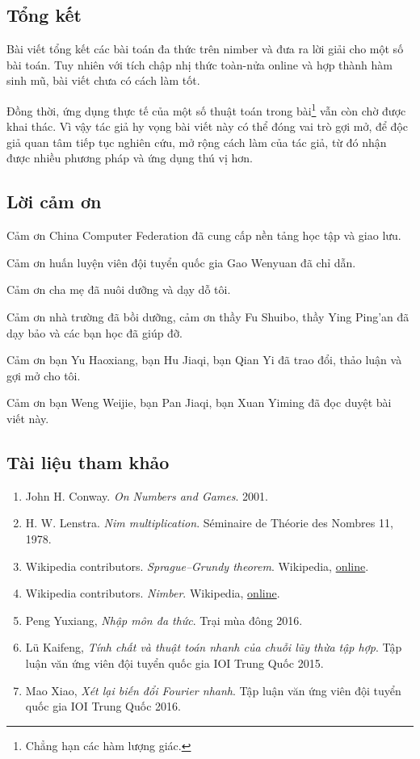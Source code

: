\documentclass[11pt]{article}
\begin{document}
\subsection{Tổng kết}

Bài viết tổng kết các bài toán đa thức trên nimber và đưa ra lời giải cho một
số bài toán. Tuy nhiên với tích chập nhị thức toàn-nửa online và hợp thành hàm
sinh mũ, bài viết chưa có cách làm tốt.

Đồng thời, ứng dụng thực tế của một số thuật toán trong bài\footnote{Chẳng hạn
các hàm lượng giác.} vẫn còn chờ được khai thác. Vì vậy tác giả hy vọng bài
viết này có thể đóng vai trò gợi mở, để độc giả quan tâm tiếp tục nghiên cứu,
mở rộng cách làm của tác giả, từ đó nhận được nhiều phương pháp và ứng dụng thú
vị hơn.

\subsection*{Lời cảm ơn}

Cảm ơn China Computer Federation đã cung cấp nền tảng học tập và giao lưu.

Cảm ơn huấn luyện viên đội tuyển quốc gia Gao Wenyuan đã chỉ dẫn.

Cảm ơn cha mẹ đã nuôi dưỡng và dạy dỗ tôi.

Cảm ơn nhà trường đã bồi dưỡng, cảm ơn thầy Fu Shuibo, thầy Ying Ping'an đã dạy
bảo và các bạn học đã giúp đỡ.

Cảm ơn bạn Yu Haoxiang, bạn Hu Jiaqi, bạn Qian Yi đã trao đổi, thảo luận và gợi
mở cho tôi.

Cảm ơn bạn Weng Weijie, bạn Pan Jiaqi, bạn Xuan Yiming đã đọc duyệt bài viết
này.

\subsection*{Tài liệu tham khảo}

\begin{enumerate}
  \item John H. Conway. \emph{On Numbers and Games}. 2001.
  \item H. W. Lenstra. \emph{Nim multiplication}. Séminaire de Théorie des
  Nombres 11, 1978.
  \item Wikipedia contributors. \emph{Sprague--Grundy theorem}. Wikipedia,
  \href{https://en.wikipedia.org/wiki/Sprague-Grundy_theorem}{online}.
  \item Wikipedia contributors. \emph{Nimber}. Wikipedia,
  \href{https://en.wikipedia.org/wiki/Nimber}{online}.
  \item Peng Yuxiang, \emph{Nhập môn đa thức}. Trại mùa đông 2016.
  \item Lü Kaifeng, \emph{Tính chất và thuật toán nhanh của chuỗi lũy thừa tập
  hợp}. Tập luận văn ứng viên đội tuyển quốc gia IOI Trung Quốc 2015.
  \item Mao Xiao, \emph{Xét lại biến đổi Fourier nhanh}. Tập luận văn ứng viên
  đội tuyển quốc gia IOI Trung Quốc 2016.
\end{enumerate}
\end{document}
